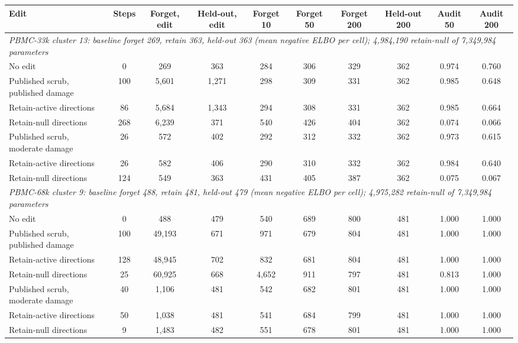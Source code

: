 \begin{tabular}{lccccccccc}
\toprule
Edit & Steps & Forget, edit & Held-out, edit & Forget 10 & Forget 50 & Forget 200 & Held-out 200 & Audit 50 & Audit 200 \\
\midrule
\multicolumn{10}{l}{\emph{PBMC-33k cluster 13: baseline forget 269, retain 363, held-out 363 (mean negative ELBO per cell); 4,984,190 retain-null of 7,349,984 parameters}} \\
No edit & 0 & 269 & 363 & 284 & 306 & 329 & 362 & 0.974 & 0.760 \\
Published scrub, published damage & 100 & 5,601 & 1,271 & 298 & 309 & 331 & 362 & 0.985 & 0.648 \\
Retain-active directions & 86 & 5,684 & 1,343 & 294 & 308 & 331 & 362 & 0.985 & 0.664 \\
Retain-null directions & 268 & 6,239 & 371 & 540 & 426 & 404 & 362 & 0.074 & 0.066 \\
Published scrub, moderate damage & 26 & 572 & 402 & 292 & 312 & 332 & 362 & 0.973 & 0.615 \\
Retain-active directions & 26 & 582 & 406 & 290 & 310 & 332 & 362 & 0.984 & 0.640 \\
Retain-null directions & 124 & 549 & 363 & 431 & 405 & 387 & 362 & 0.075 & 0.067 \\
\midrule
\multicolumn{10}{l}{\emph{PBMC-68k cluster 9: baseline forget 488, retain 481, held-out 479 (mean negative ELBO per cell); 4,975,282 retain-null of 7,349,984 parameters}} \\
No edit & 0 & 488 & 479 & 540 & 689 & 800 & 481 & 1.000 & 1.000 \\
Published scrub, published damage & 100 & 49,193 & 671 & 971 & 679 & 804 & 481 & 1.000 & 1.000 \\
Retain-active directions & 128 & 48,945 & 702 & 832 & 681 & 804 & 481 & 1.000 & 1.000 \\
Retain-null directions & 25 & 60,925 & 668 & 4,652 & 911 & 797 & 481 & 0.813 & 1.000 \\
Published scrub, moderate damage & 40 & 1,106 & 481 & 542 & 682 & 801 & 481 & 1.000 & 1.000 \\
Retain-active directions & 50 & 1,038 & 481 & 541 & 684 & 799 & 481 & 1.000 & 1.000 \\
Retain-null directions & 9 & 1,483 & 482 & 551 & 678 & 801 & 481 & 1.000 & 1.000 \\
\bottomrule
\end{tabular}

